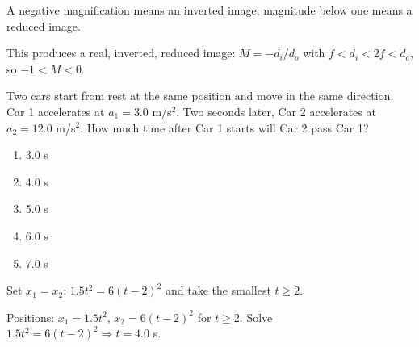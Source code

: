 \begin{answerbox}
\end{answerbox}
\begin{insightbox}
A negative magnification means an inverted image; magnitude below one means a reduced image.
\end{insightbox}
\begin{solutionbox}

This produces a real, inverted, reduced image: $M=-d_i/d_o$ with $f<d_i<2f<d_o$, so $-1<M<0$.
\end{solutionbox}

\item \label{prob:35}
Two cars start from rest at the same position and move in the same direction. Car 1 accelerates at $a_1=3.0$ m/s$^2$. Two seconds later, Car 2 accelerates at $a_2=12.0$ m/s$^2$. How much time after Car 1 starts will Car 2 pass Car 1?
\begin{enumerate}[label=(\Alph*)]
    \item 3.0 s
    \item 4.0 s
    \item 5.0 s
    \item 6.0 s
    \item 7.0 s
\end{enumerate}

\begin{answerbox}
\end{answerbox}
\begin{insightbox}
Set $x_1=x_2$: $1.5t^2=6(t-2)^2$ and take the smallest $t\ge2$.
\end{insightbox}
\begin{solutionbox}

Positions: $x_1=1.5t^2$, $x_2=6(t-2)^2$ for $t\ge2$. Solve $1.5t^2=6(t-2)^2 \Rightarrow t=4.0$ s.
\end{solutionbox}

